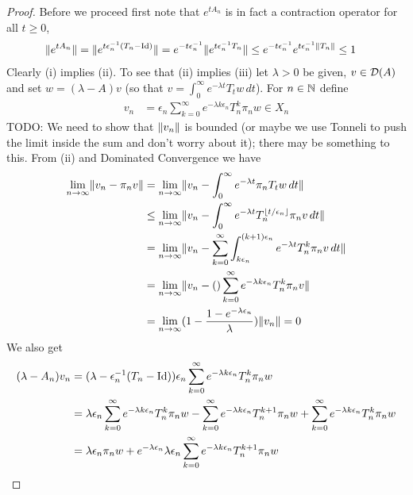 \begin{proof}
Before we proceed first note that $e^{t A_n}$ is in fact a contraction operator for all $t \geq 0$,
\begin{align*}
\lVert e^{t A_n} \rVert &= \lVert e^{t \epsilon_n^{-1}(T_n - \operatorname*{Id})} \rVert = e^{-t \epsilon_n^{-1}} \lVert e^{t \epsilon_n^{-1} T_n} \rVert \leq e^{-t \epsilon_n^{-1}} e^{t \epsilon_n^{-1} \lVert T_n \rVert} \leq 1
\end{align*}
Clearly (i) implies (ii).  To see that (ii) implies (iii) let $\lambda > 0$ be given, $v \in \mathcal{D}(A)$ and set $w = (\lambda - A) v$ (so that $v = \int_0^\infty e^{-\lambda t} T_t w \, dt$).  For $n \in \mathbb{N}$ define
\begin{align*}
v_n &= \epsilon_n \sum_{k=0}^\infty e^{-\lambda k \epsilon_n} T_n^k \pi_n w \in X_n
\end{align*}
TODO: We need to show that $\lVert v_n \rVert$ is bounded (or maybe we use Tonneli to push the limit inside the sum and don't worry about it); there may be something to this.
From (ii) and Dominated Convergence we have
\begin{align*}
\lim_{n \to \infty} \lVert v_n - \pi_n v \rVert &= \lim_{n \to \infty} \lVert v_n - \int_0^\infty e^{-\lambda t} \pi_n T_t w \, dt \rVert \\
&\leq  \lim_{n \to \infty} \lVert v_n - \int_0^\infty e^{-\lambda t} T^{\lfloor t/\epsilon_n \rfloor}_{n} \pi_n v \, dt \rVert \\
&= \lim_{n \to \infty} \lVert v_n - \sum_{k=0}^\infty \int_{k\epsilon_n}^{(k+1)\epsilon_n} e^{-\lambda t} T^{k}_{n} \pi_n v \, dt \rVert \\
&= \lim_{n \to \infty} \lVert v_n - () \sum_{k=0}^\infty e^{-\lambda k \epsilon_n} T^{k}_{n} \pi_n v  \rVert\\
&= \lim_{n \to \infty} (1 - \frac{1-e^{-\lambda \epsilon_n}}{\lambda})\lVert v_n \rVert  = 0\\
\end{align*}
We also get
\begin{align*}
(\lambda - A_n) v_n &= (\lambda - \epsilon_n^{-1}(T_n - \IdentityMatrix)) \epsilon_n \sum_{k=0}^\infty e^{-\lambda k \epsilon_n} T_n^k \pi_n w \\
&=\lambda \epsilon_n \sum_{k=0}^\infty e^{-\lambda k \epsilon_n} T_n^k \pi_n w 
- \sum_{k=0}^\infty e^{-\lambda k \epsilon_n} T_n^{k+1} \pi_n w +  
\sum_{k=0}^\infty e^{-\lambda k \epsilon_n} T_n^{k} \pi_n w \\
&= \lambda \epsilon_n \pi_n w 
+ e^{-\lambda \epsilon_n} \lambda \epsilon_n \sum_{k=0}^\infty e^{-\lambda k \epsilon_n} T_n^{k+1} \pi_n w 

\end{align*}
\end{proof}
